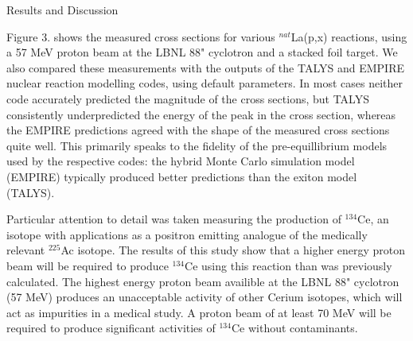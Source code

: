 \documentclass[final]{beamer}
\newlength{\onecolwid}
\begin{document}
\begin{frame}[t]
\begin{columns}[t]
\begin{column}{\onecolwid}
\begin{block}{Results and Discussion}
\small{\hspace*{50pt}Figure 3. shows the measured cross sections for various $^{nat}$La(p,x) reactions, using a 57 MeV proton beam at the LBNL 88" cyclotron and a stacked foil target.  We also compared these measurements with the outputs of the TALYS and EMPIRE nuclear reaction modelling codes, using default parameters.  In most cases neither code accurately predicted the magnitude of the cross sections, but TALYS consistently underpredicted the energy of the peak in the cross section, whereas the EMPIRE predictions agreed with the shape of the measured cross sections quite well.  This primarily speaks to the fidelity of the pre-equillibrium models used by the respective codes: the hybrid Monte Carlo simulation model (EMPIRE) typically produced better predictions than the exiton model (TALYS).

\hspace*{50pt}Particular attention to detail was taken measuring the production of $^{134}$Ce, an isotope with applications as a positron emitting analogue of the medically relevant $^{225}$Ac isotope.  The results of this study show that a higher energy proton beam will be required to produce $^{134}$Ce using this reaction than was previously calculated.  The highest energy proton beam availible at the LBNL 88" cyclotron (57 MeV) produces an unacceptable activity of other Cerium isotopes, which will act as impurities in a medical study.  A proton beam of at least 70 MeV will be required to produce significant activities of $^{134}$Ce without contaminants.

}


\end{block}
\end{column}
\end{columns}
\end{frame}
\end{document}
